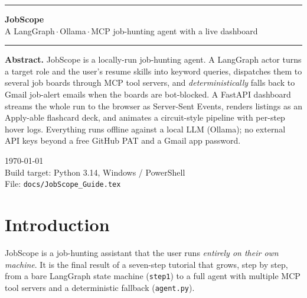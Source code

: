 \documentclass[11pt,a4paper]{article}
\newcommand{\file}[1]{\texttt{\small #1}}
\begin{document}
\begin{titlepage}
  \centering
  \vspace*{2.5cm}
  {\color{indigo}\rule{\textwidth}{2pt}}

  \vspace{0.9cm}
  {\fontsize{34}{40}\selectfont\bfseries\color{indigo} JobScope}\\[6pt]
  {\Large A LangGraph\,$\cdot$\,Ollama\,$\cdot$\,MCP job-hunting agent with a live dashboard}

  \vspace{0.9cm}
  {\color{indigo}\rule{\textwidth}{2pt}}

  \vspace{2.6cm}
  \begin{minipage}{0.78\textwidth}
    \small
    \textbf{Abstract.} JobScope is a locally-run job-hunting agent.
    A LangGraph actor turns a target role and the user's resume skills into
    keyword queries, dispatches them to several job boards through MCP tool
    servers, and \emph{deterministically} falls back to Gmail job-alert
    emails when the boards are bot-blocked. A FastAPI dashboard streams the
    whole run to the browser as Server-Sent Events, renders listings as an
    Apply-able flashcard deck, and animates a circuit-style pipeline with
    per-step hover logs. Everything runs offline against a local LLM (Ollama);
    no external API keys beyond a free GitHub PAT and a Gmail app password.
  \end{minipage}

  \vspace{3cm}
  {\small \today \\[4pt]
   Build target: Python 3.14, Windows / PowerShell \\[2pt]
   File: \file{docs/JobScope\_Guide.tex}}
\end{titlepage}

\tableofcontents
\clearpage

\section{Introduction}
\label{sec:intro}

JobScope is a job-hunting assistant that the user runs \emph{entirely on their
own machine}. It is the final result of a seven-step tutorial that grows, step
by step, from a bare LangGraph state machine (\file{step1}) to a full agent
with multiple MCP tool servers and a deterministic fallback
(\file{agent.py}).
\end{document}
